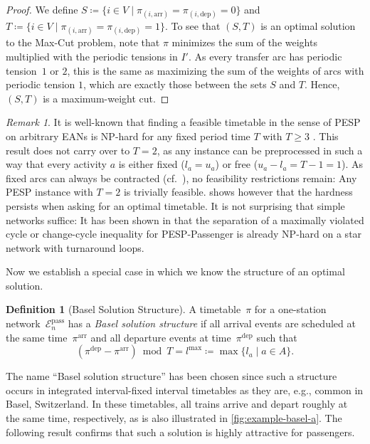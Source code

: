 \documentclass[11pt,a4paper]{article}
\newcommand{\arr}{\mathrm{arr}}
\newcommand{\dep}{\mathrm{dep}}
\newcommand{\pesppassenger}{PESP-Passenger\xspace}
\newcommand{\cE}{\mathcal{E}}
\theoremstyle{definition}
\newtheorem{definition}[theorem]{Definition}
\theoremstyle{remark}
\newtheorem*{remark}{Remark}
\begin{document}
\begin{proof}
    We define $S \coloneqq \{i \in V \mid \pi_{(i,\arr)} = \pi_{(i,\dep)} = 0\}$ and $T \coloneqq \{i \in V \mid \pi_{(i,\arr)} = \pi_{(i,\dep)} = 1\}$.
	To see that $(S,T)$ is an optimal solution to the Max-Cut problem,
    note that $\pi$ minimizes the sum of the weights multiplied with the periodic tensions in $I'$. As every transfer arc has periodic tension~$1$ or $2$, this is the same as maximizing the sum of the weights of arcs with periodic tension $1$, which are exactly those between the sets $S$ and $T$. Hence, $(S,T)$ is a maximum-weight cut.
\end{proof}

\begin{remark}
It is well-known that finding a feasible timetable in the sense of PESP on arbitrary EANs is NP-hard for any fixed period time $T$ with $T \geq 3$ \cite{odijk1994}. This result does not carry over to $T = 2$, as any instance can be preprocessed in such a way that every activity $a$ is either fixed ($l_a = u_a$) or free ($u_a - l_a = T - 1 = 1$). As fixed arcs can always be contracted (cf.\ \cite{Liebchen2006}), no feasibility restrictions remain: Any PESP instance with $T = 2$ is trivially feasible.  shows however that the hardness persists when asking for an optimal timetable. It is not surprising that simple networks suffice: It has been shown in \cite{Borndoerfer2020} that the separation of a maximally violated cycle or change-cycle inequality for \pesppassenger is already NP-hard on a star network with turnaround loops.
\end{remark}


Now we establish a special case in which we know the structure of an optimal solution. 

\begin{definition}[Basel Solution Structure]
	A timetable~$\pi$ for a one-station network~$\cE_n^{\mathrm{pass}}$ has a \emph{Basel solution structure} if all arrival events are scheduled at the same time~$\pi^\arr$ and all departure events at time~$\pi^\dep$ such that 
    $$(\pi^{\dep} - \pi^\arr) \bmod T = l^{\max} \coloneqq \max \{l_{a} \mid a \in A\}.$$
\end{definition}

The name ``Basel solution structure'' has been chosen since such a structure occurs in integrated interval-fixed interval timetables as they are, e.g., common in Basel, Switzerland. In these timetables, all trains arrive and depart roughly at the same time, respectively, as is also illustrated in \cref{fig:example-basel-a}. The following result confirms that such a solution is highly attractive for passengers.
\end{document}
